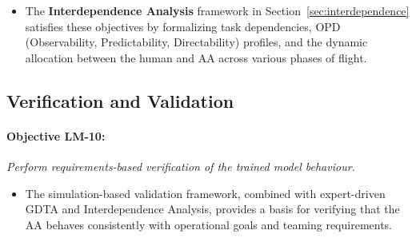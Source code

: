 \documentclass[12pt,a4paper]{article} %
\begin{document}
	\begin{itemize}
	  \item The \textbf{Interdependence Analysis} framework in Section~\ref{sec:interdependence} satisfies these objectives by formalizing task dependencies, OPD (Observability, Predictability, Directability) profiles, and the dynamic allocation between the human and AA across various phases of flight.
	\end{itemize}
	
	\subsection*{Verification and Validation}
	
	\paragraph{Objective LM-10:} \textit{Perform requirements-based verification of the trained model behaviour.}
	
	\begin{itemize}
	  \item The simulation-based validation framework, combined with expert-driven GDTA and Interdependence Analysis, provides a basis for verifying that the AA behaves consistently with operational goals and teaming requirements.
	\end{itemize}

	\printbibliography 
\end{document}
